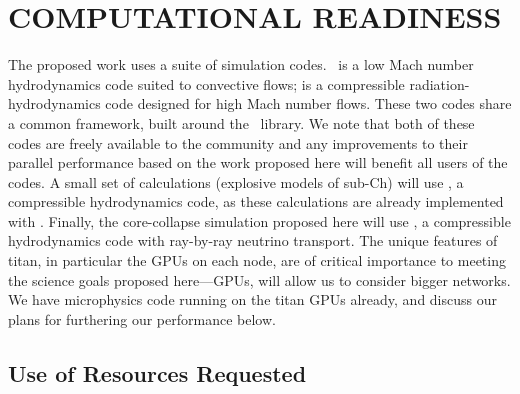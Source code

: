 
\section{COMPUTATIONAL READINESS}  


The proposed work uses a suite of simulation codes.  \maestro\ is a
low Mach number hydrodynamics code suited to convective flows; \castro
is a compressible radiation-hydrodynamics code designed for high Mach
number flows.  These two codes share a common framework, built around
the \boxlib\ library.  We note that both of these codes are freely
available to the community and any improvements to their parallel
performance based on the work proposed here will benefit all users of
the codes.  A small set of calculations (explosive models of sub-Ch)
will use \flash, a compressible hydrodynamics code, as these
calculations are already implemented with \flash.  Finally, the
core-collapse simulation proposed here will use \chimera, a
compressible hydrodynamics code with ray-by-ray neutrino transport.
The unique features of titan, in particular the GPUs on each node, are
of critical importance to meeting the science goals proposed
here---GPUs, will allow us to consider bigger networks.  We have
microphysics code running on the titan GPUs already, and discuss our plans
for furthering our performance below.


\subsection{Use of Resources Requested}


